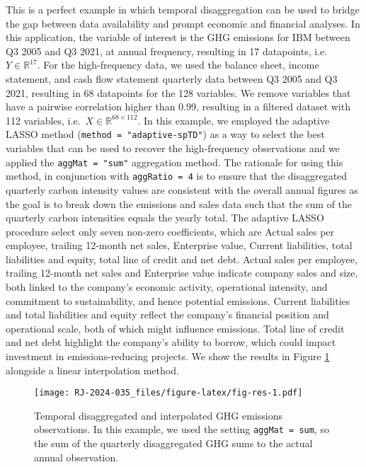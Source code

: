 This is a perfect example in which temporal disaggregation can be used to bridge the gap between data availability and prompt economic and financial analyses. In this application, the variable of interest is the GHG emissions for IBM between Q3 2005 and Q3 2021, at annual frequency, resulting in 17 datapoints, i.e.~\(Y\in \mathbb{R}^{17}\). For the high-frequency data, we used the balance sheet, income statement, and cash flow statement quarterly data between Q3 2005 and Q3 2021, resulting in 68 datapoints for the 128 variables. We remove variables that have a pairwise correlation higher than 0.99, resulting in a filtered dataset with 112 variables, i.e.~\(X \in \mathbb{R}^{68\times 112}\). In this example, we employed the adaptive LASSO method (\texttt{method\ =\ "adaptive-spTD"}) as a way to select the best variables that can be used to recover the high-frequency observations and we applied the \texttt{aggMat\ =\ "sum"} aggregation method. The rationale for using this method, in conjunction with \texttt{aggRatio\ =\ 4} is to ensure that the disaggregated quarterly carbon intensity values are consistent with the overall annual figures as the goal is to break down the emissions and sales data such that the sum of the quarterly carbon intensities equals the yearly total. The adaptive LASSO procedure select only seven non-zero coefficients, which are Actual sales per employee, trailing 12-month net sales, Enterprise value, Current liabilities, total liabilities and equity, total line of credit and net debt. Actual sales per employee, trailing 12-month net sales and Enterprise value indicate company sales and size, both linked to the company's economic activity, operational intensity, and commitment to sustainability, and hence potential emissions. Current liabilities and total liabilities and equity reflect the company's financial position and operational scale, both of which might influence emissions. Total line of credit and net debt highlight the company's ability to borrow, which could impact investment in emissions-reducing projects. We show the results in Figure \ref{fig:fig-res} alongside a linear interpolation method.

\begin{figure}
\centering
\texttt{[image: RJ-2024-035\_files/figure-latex/fig-res-1.pdf]}
\caption{\label{fig:fig-res}Temporal disaggregated and interpolated GHG emissions observations. In this example, we used the setting \texttt{aggMat\ =\ sum}, so the sum of the quarterly disaggregated GHG sums to the actual annual observation.}
\end{figure}

